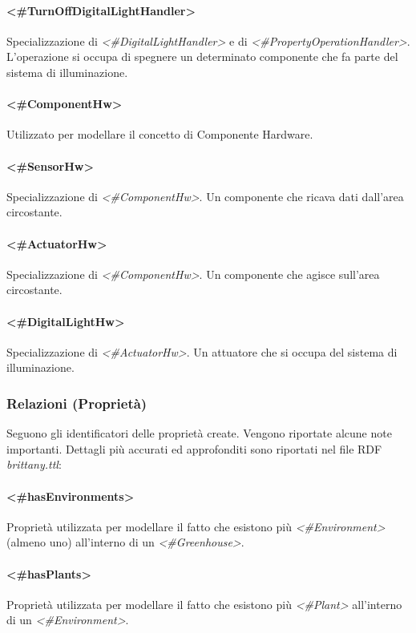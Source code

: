 \paragraph{<\#TurnOffDigitalLightHandler>}
Specializzazione di \textit{<\#DigitalLightHandler>} e di \textit{<\#PropertyOperationHandler>}. L'operazione si occupa di spegnere un determinato componente che fa parte del sistema di illuminazione.
\paragraph{<\#ComponentHw>}
Utilizzato per modellare il concetto di Componente Hardware.
\paragraph{<\#SensorHw>}
Specializzazione di \textit{<\#ComponentHw>}. Un componente che ricava dati dall'area circostante.
\paragraph{<\#ActuatorHw>}
Specializzazione di \textit{<\#ComponentHw>}. Un componente che agisce sull'area circostante.
\paragraph{<\#DigitalLightHw>}
Specializzazione di \textit{<\#ActuatorHw>}. Un attuatore che si occupa del sistema di illuminazione.

\subsubsection{Relazioni (Proprietà)}
Seguono gli identificatori delle proprietà create. Vengono riportate alcune note importanti. Dettagli più accurati ed approfonditi sono riportati nel file RDF \textit{brittany.ttl}:

\paragraph{<\#hasEnvironments>}
Proprietà utilizzata per modellare il fatto che esistono più \textit{<\#Environment>} (almeno uno) all'interno di un \textit{<\#Greenhouse>}.
\paragraph{<\#hasPlants>}
Proprietà utilizzata per modellare il fatto che esistono più \textit{<\#Plant>} all'interno di un \textit{<\#Environment>}.
